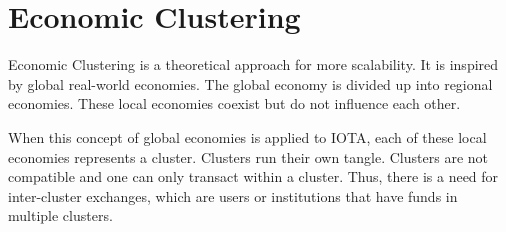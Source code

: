 \section{Economic Clustering}\label{economic-clustering}

Economic Clustering is a theoretical approach for more scalability. It is inspired by global real-world economies. The global economy is divided up into regional economies. These local economies coexist but do not influence each other. 

When this concept of global economies is applied to IOTA, each of these local economies represents a cluster. Clusters run their own tangle. Clusters are not compatible and one can only transact within a cluster. Thus, there is a need for inter-cluster exchanges, which are users or institutions that have funds in multiple clusters. 
